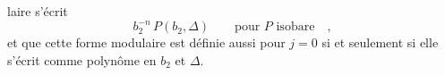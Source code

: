 %
laire s'écrit
\[
b_2^{-n}\,P(b_2,\Delta)\qquad\text{pour }P\text{ isobare}\quad,
\]
et que cette forme modulaire est définie aussi pour $j=0$ si et seulement si elle s'écrit comme polynôme en $b_2$ et $\Delta$.

